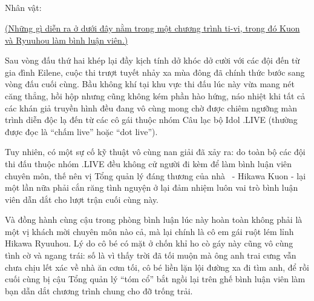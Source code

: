 \documentclass[../main.tex]{subfiles}
\begin{document}
\newpage

\subsection*{\label{ep-003.III}}

\vspace{-4pt}
\begin{center}
  {\caviar\fontsize{12pt}{12pt}\selectfont Nhân vật:          }
\end{center}

\begin{center}
  \uline{(Những gì diễn ra ở dưới đây nằm trong một chương trình ti-vi, trong đó Kuon và Ryuuhou làm bình luận viên.)}
\end{center}

Sau vòng đấu thứ hai khép lại đầy kịch tính dở khóc dở cười với các đội đến từ gia đình Eilene, cuộc thi trượt tuyết nhảy xa mùa đông đã chính thức bước sang vòng đấu cuối cùng. Bầu không khí tại khu vực thi đấu lúc này vừa mang nét căng thẳng, hồi hộp nhưng cũng không kém phần hào hứng, náo nhiệt khi tất cả các khán giả truyền hình đều đang vô cùng mong chờ được chiêm ngưỡng màn trình diễn độc lạ đến từ các cô gái thuộc nhóm Câu lạc bộ Idol .LIVE (thường được đọc là ``chấm live'' hoặc ``dot live'').

Tuy nhiên, có một sự cố kỹ thuật vô cùng nan giải đã xảy ra: do toàn bộ các đội thi đấu thuộc nhóm .LIVE đều không cử người đi kèm để làm bình luận viên chuyên môn, thế nên vị Tổng quản lý đáng thương của nhà \hll\ - Hikawa Kuon - lại một lần nữa phải cắn răng tình nguyện ở lại đảm nhiệm luôn vai trò bình luận viên dẫn dắt cho lượt trận cuối cùng này.

Và đồng hành cùng cậu trong phòng bình luận lúc này hoàn toàn không phải là một vị khách mời chuyên môn nào cả, mà lại chính là cô em gái ruột lém lỉnh Hikawa Ryuuhou. Lý do cô bé có mặt ở chốn khỉ ho cò gáy này cũng vô cùng tình cờ và ngang trái: số là vì thấy trời đã tối muộn mà ông anh trai cưng vẫn chưa chịu lết xác về nhà ăn cơm tối, cô bé liền lặn lội đường xa đi tìm anh, để rồi cuối cùng bị cậu Tổng quản lý ``tóm cổ'' bắt ngồi lại trên ghế bình luận viên làm bạn dẫn dắt chương trình chung cho đỡ trống trải.
\end{document}
